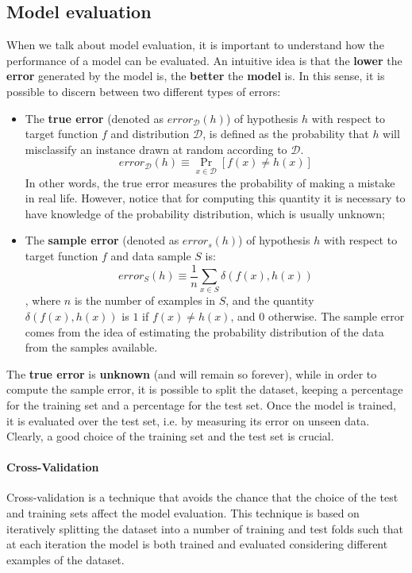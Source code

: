 \subsection{Model evaluation}
When we talk about model evaluation, it is important to understand how the performance of a model can be evaluated. An intuitive idea is that the \textbf{lower} the \textbf{error} generated by the model is, the \textbf{better} the \textbf{model} is. In this sense, it is possible to discern between two different types of errors:
\begin{itemize}
	\item The \textbf{true error} (denoted as $error_{\mathcal{D}}(h)$) of hypothesis $h$ with respect to target function $f$ and distribution $\mathcal{D}$, is defined as the probability that $h$ will misclassify an instance drawn at random according to $\mathcal{D}$.
	$$error_{\mathcal{D}}(h) \equiv \operatorname{Pr}_{x \in \mathcal{D}} \left[f(x) \neq h(x)\right]$$ 
	In other words, the true error measures the probability of making a mistake in real life. However, notice that for computing this quantity it is necessary to have knowledge of the probability distribution, which is usually unknown;
	
	\item The \textbf{sample error} (denoted as $error_{s}(h)$) of hypothesis $h$ with respect to target function $f$ and data sample $S$ is:
	$$error_{S}(h) \equiv \frac{1}{n} \sum_{x \in S} \delta (f(x) , h(x))$$ 
	, where $n$ is the number of examples in $S$, and the quantity $\delta(f(x), h(x))$ is $1$ if $f(x) \neq h(x)$, and $0$ otherwise. The sample error comes from the idea of estimating the probability distribution of the data from the samples available.
\end{itemize}

The \textbf{true error} is \textbf{unknown} (and will remain so forever), while in order to compute the sample error, it is possible to split the dataset, keeping a percentage for the training set and a percentage for the test set. Once the model is trained, it is evaluated over the test set, i.e. by measuring its error on unseen data. Clearly, a good choice of the training set and the test set is crucial.


\paragraph{Cross-Validation} Cross-validation is a technique that avoids the chance that the choice of the test and training sets affect the model evaluation. This technique is based on iteratively splitting the dataset into a number of training and test folds such that at each iteration the model is both trained and evaluated considering different examples of the dataset.

